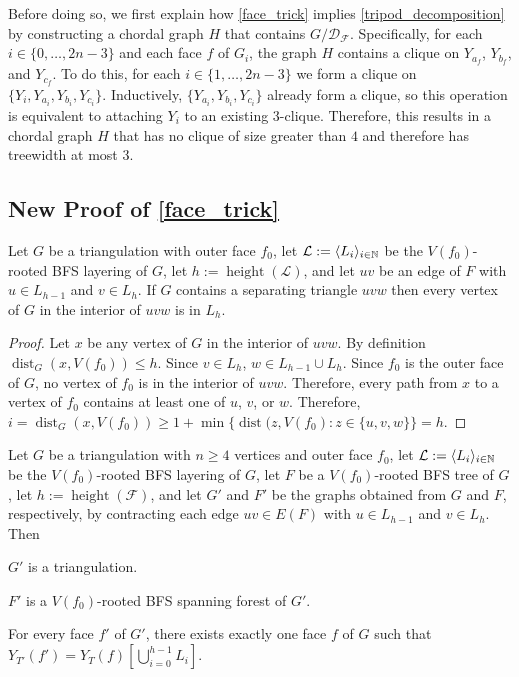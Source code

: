 \documentclass{patmorin}
\DeclareMathOperator{\height}{height}
\DeclareMathOperator{\dist}{dist}
\begin{document}
Before doing so, we first explain how \cref{face_trick} implies \cref{tripod_decomposition} by constructing a chordal graph $H$ that contains $G/\mathcal{D_F}$.  Specifically, for each $i\in\{0,\ldots,2n-3\}$ and each face $f$ of $G_i$, the graph $H$ contains a clique on $Y_{a_f}$, $Y_{b_f}$, and $Y_{c_f}$.  To do this, for each $i\in\{1,\ldots,2n-3\}$ we form a clique on  $\{Y_i,Y_{a_i},Y_{b_i},Y_{c_i}\}$.  Inductively, $\{Y_{a_i},Y_{b_i},Y_{c_i}\}$ already form a clique, so this operation is equivalent to attaching $Y_i$ to an existing $3$-clique.  Therefore, this results in a chordal graph $H$ that has no clique of size greater than $4$ and therefore has treewidth at most $3$.

\subsection{New Proof of \cref{face_trick}}

\begin{obs}\label{separating_triangle_depth}
  Let $G$ be a triangulation with outer face $f_0$, let $\mathcal{L}:=\langle L_i\rangle_{i\in\mathbb{N}}$ be the $V(f_0)$-rooted BFS layering of $G$, let $h:=\height(\mathcal{L})$, and let $uv$ be an edge of $F$ with $u\in L_{h-1}$ and $v\in L_h$.  If $G$ contains a separating triangle $uvw$ then every vertex of $G$ in the interior of $uvw$ is in $L_h$.
\end{obs}

\begin{proof}
  Let $x$ be any vertex of $G$ in the interior of $uvw$. By definition $\dist_G(x,V(f_0))\le h$.  Since $v\in L_h$, $w\in L_{h-1}\cup L_h$.  Since $f_0$ is the outer face of $G$, no vertex of $f_0$ is in the interior of $uvw$.  Therefore, every path from $x$ to a vertex of $f_0$ contains at least one of $u$, $v$, or $w$.  Therefore, $i=\dist_G(x,V(f_0))\ge 1+\min\{\dist(z,V(f_0):z\in\{u,v,w\}\}=h$.
\end{proof}


\begin{lem}\label{retriangulate}
  Let $G$ be a triangulation with $n\ge 4$ vertices and outer face $f_0$, let $\mathcal{L}:=\langle L_i\rangle_{i\in\mathbb{N}}$ be the $V(f_0)$-rooted BFS layering of $G$, let $F$ be a $V(f_0)$-rooted BFS tree of $G$, let $h:=\height(\mathcal{F})$, and let $G'$ and $F'$ be the graphs obtained from $G$ and $F$, respectively, by contracting each edge $uv\in E(F)$ with $u\in L_{h-1}$ and $v\in L_h$.  Then
  \begin{compactenum}[(1)]
    \item $G'$ is a triangulation.
    \item $F'$ is a $V(f_0)$-rooted BFS spanning forest of $G'$.
    \item For every face $f'$ of $G'$, there exists exactly one face $f$ of $G$ such that  $Y_{T'}(f')=Y_{T}(f)[\bigcup_{i=0}^{h-1} L_i]$.
  \end{compactenum}
\end{lem}
\end{document}
